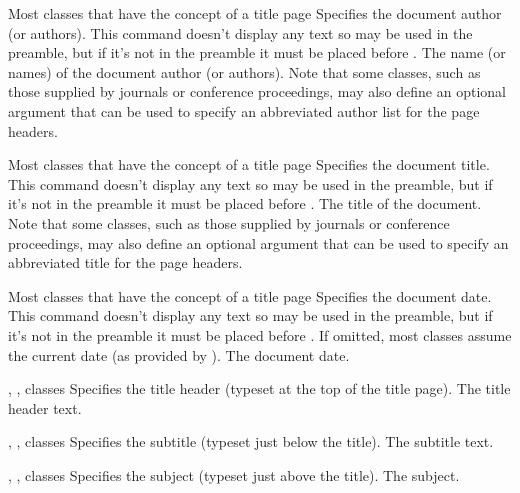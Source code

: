 %
 {}%
 {Most classes that have the concept of a title page}%
 {Specifies the document author (or authors). This command doesn't
  display any text so may be used in the preamble, but if it's not
  in the preamble it must be placed before .}%
 {%
   \BeginArgList
     The name (or names) of the document author
     (or authors).
   \EndArgList
   Note that some classes, such as those supplied by journals or
   conference proceedings, may also define an optional argument
   that can be used to specify an abbreviated author list for the
   page headers.
 }

%
 {}%
 {Most classes that have the concept of a title page}%
 {Specifies the document title. This command doesn't
  display any text so may be used in the preamble, but if it's not
  in the preamble it must be placed before .}%
 {%
   \BeginArgList
     The title of the document.
   \EndArgList
   Note that some classes, such as those supplied by journals or
   conference proceedings, may also define an optional argument
   that can be used to specify an abbreviated title for the page
   headers.
 }

%
 {}%
 {Most classes that have the concept of a title page}%
 {Specifies the document date. This command doesn't
  display any text so may be used in the preamble, but if it's not
  in the preamble it must be placed before . If omitted, most
  classes assume the current date (as provided by ).}%
 {%
   \BeginArgList
     The document date.
   \EndArgList
 }

%
 {}%
 {, ,  classes}%
 {Specifies the title header (typeset at the top of the title page).}%
 {%
   \BeginArgList
     The title header text.
   \EndArgList
 }

%
 {}%
 {, ,  classes}%
 {Specifies the subtitle (typeset just below the title).}%
 {%
   \BeginArgList
     The subtitle text.
   \EndArgList
 }

%
 {}%
 {, ,  classes}%
 {Specifies the subject (typeset just above the title).}%
 {%
   \BeginArgList
     The subject.
   \EndArgList
 }

